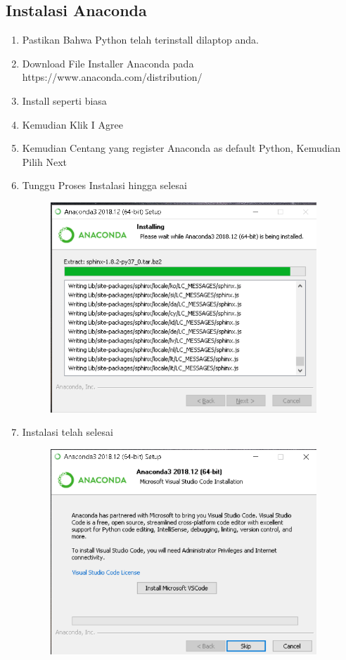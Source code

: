 \subsection{Instalasi Anaconda}
\begin{enumerate}
    \item Pastikan Bahwa Python telah terinstall dilaptop anda.
    \item Download File Installer Anaconda pada https://www.anaconda.com/distribution/
	\item Install seperti biasa 
    \item Kemudian Klik I Agree
    \item Kemudian Centang yang register Anaconda as default Python, Kemudian Pilih Next
    \item Tunggu Proses Instalasi hingga selesai
    \begin{figure}[H]
		\includegraphics[width=10cm]{figures/fahmi/1.png}
		\centering
	\end{figure}

    \item Instalasi telah selesai
	 \begin{figure}[H]
		\includegraphics[width=10cm]{figures/fahmi/2.png}
		\centering
	\end{figure}
	
\end{enumerate}
	

